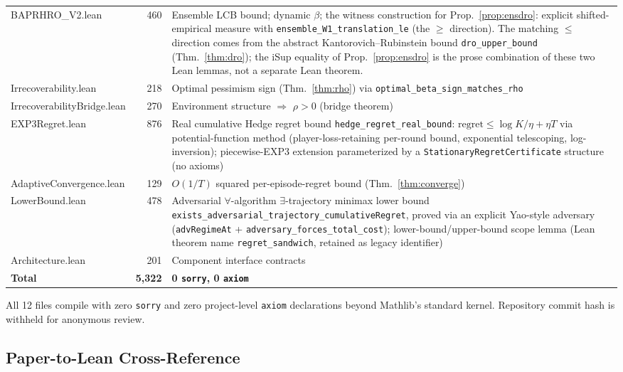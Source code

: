 \documentclass[opre,dblanonrev]{informs4}
\begin{document}
\begin{APPENDICES}
\begin{table}
{\begin{tabular}{lrp{8.4cm}}
BAPRHRO\_V2.lean & 460 & Ensemble LCB bound; dynamic $\beta$; the witness construction for Prop.~\ref{prop:ensdro}: explicit shifted-empirical measure with \texttt{ensemble\_W1\_translation\_le} (the $\geq$ direction). The matching $\leq$ direction comes from the abstract Kantorovich--Rubinstein bound \texttt{dro\_upper\_bound} (Thm.~\ref{thm:dro}); the iSup equality of Prop.~\ref{prop:ensdro} is the prose combination of these two Lean lemmas, not a separate Lean theorem. \\
Irrecoverability.lean & 218 & Optimal pessimism sign (Thm.~\ref{thm:rho}) via \texttt{optimal\_beta\_sign\_matches\_rho} \\
IrrecoverabilityBridge.lean & 270 & Environment structure $\Rightarrow$ $\rho > 0$ (bridge theorem) \\
EXP3Regret.lean & 876 & Real cumulative Hedge regret bound \texttt{hedge\_regret\_real\_bound}: $\mathrm{regret} \leq \log K / \eta + \eta T$ via potential-function method (player-loss-retaining per-round bound, exponential telescoping, log-inversion); piecewise-EXP3 extension parameterized by a \texttt{StationaryRegretCertificate} structure (no axioms) \\
AdaptiveConvergence.lean & 129 & $O(1/T)$ squared per-episode-regret bound (Thm.~\ref{thm:converge}) \\
LowerBound.lean & 478 & Adversarial $\forall$-algorithm $\exists$-trajectory minimax lower bound \texttt{exists\_adversarial\_trajectory\_cumulativeRegret}, proved via an explicit Yao-style adversary (\texttt{advRegimeAt} + \texttt{adversary\_forces\_total\_cost}); lower-bound/upper-bound scope lemma (Lean theorem name \texttt{regret\_sandwich}, retained as legacy identifier) \\
Architecture.lean & 201 & Component interface contracts \\
\midrule
\textbf{Total} & \textbf{5{,}322} & \textbf{0 \texttt{sorry}, 0 \texttt{axiom}} \\
\bottomrule
\end{tabular}}
{All 12 files compile with zero \texttt{sorry} and zero
project-level \texttt{axiom} declarations beyond Mathlib's standard
kernel. Repository commit hash is withheld for anonymous review.}
\end{table}

\subsection{Paper-to-Lean Cross-Reference}
\label{sec:lean_xref}


\end{APPENDICES}
\end{document}
